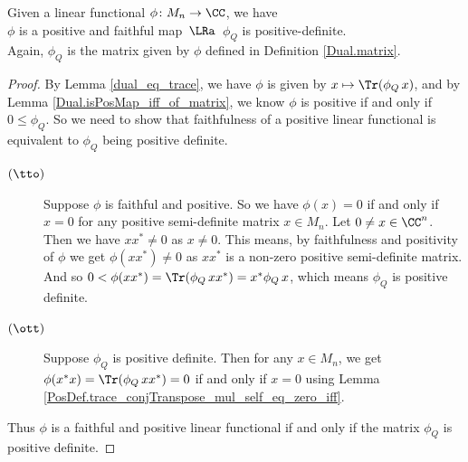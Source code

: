  \begin{proposition}\label{Dual.isFaithfulPosMap_iff}
    \leanok
    Given a linear functional $\phi\colon{M_n}\to\CC$, we have\\
    \hspace*{0.5cm}$\phi$ is a positive and faithful map $\,\LRa\,$ $\phi_Q$ is positive-definite.\\
    Again, $\phi_Q$ is the matrix given by $\phi$ defined in Definition \ref{Dual.matrix}.
   \end{proposition}
   \begin{proof}\leanok
    By Lemma \ref{dual_eq_trace}, we have $\phi$ is given by $x\mapsto\Tr(\phi_Q\, x)$, and by Lemma \ref{Dual.isPosMap_iff_of_matrix}, we know $\phi$ is positive if and only if $0\leq\phi_Q$.
    So we need to show that faithfulness of a positive linear functional is equivalent to $\phi_Q$ being positive definite.
    \begin{description}
     \item[$(\tto)$]
      Suppose $\phi$ is faithful and positive.
      So we have $\phi(x)=0$ if and only if $x=0$ for any positive semi-definite matrix $x\in{M_n}$.
      Let $0\neq{x}\in\CC^n$. Then we have $xx^*\neq0$ as $x\neq0$. This means, by faithfulness and positivity of $\phi$ we get $\phi(xx^*)\neq0$ as $xx^*$ is a non-zero positive semi-definite matrix. And so $0<\phi(xx^*)=\Tr(\phi_Q\, xx^*)=x^*\phi_Q\, x$, which means $\phi_Q$ is positive definite.
     \item[$(\ott)$]
      Suppose $\phi_Q$ is positive definite. Then for any $x\in{M_n}$, we get $\phi(x^*x)=\Tr(\phi_Q\, xx^*)=0$ if and only if $x=0$ using Lemma \ref{PosDef.trace_conjTranspose_mul_self_eq_zero_iff}.
    \end{description}
    Thus $\phi$ is a faithful and positive linear functional if and only if the matrix $\phi_Q$ is positive definite.
   \end{proof}

